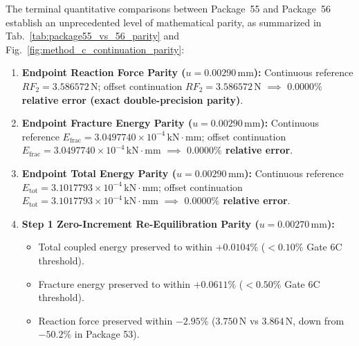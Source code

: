 The terminal quantitative comparisons between Package~55 and Package~56 establish an unprecedented level of mathematical parity, as summarized in Tab.~\ref{tab:package55_vs_56_parity} and Fig.~\ref{fig:method_c_continuation_parity}:
\begin{enumerate}
  \item \textbf{Endpoint Reaction Force Parity ($u = 0.00290\,\mathrm{mm}$):} Continuous reference $RF_2 = 3.586572\,\mathrm{N}$; offset continuation $RF_2 = 3.586572\,\mathrm{N}$ $\implies$ \textbf{$\mathbf{0.0000\%}$ relative error (exact double-precision parity)}.
  \item \textbf{Endpoint Fracture Energy Parity ($u = 0.00290\,\mathrm{mm}$):} Continuous reference $E_{\mathrm{frac}} = 3.0497740 \times 10^{-4}\,\mathrm{kN\cdot mm}$; offset continuation $E_{\mathrm{frac}} = 3.0497740 \times 10^{-4}\,\mathrm{kN\cdot mm}$ $\implies$ \textbf{$\mathbf{0.0000\%}$ relative error}.
  \item \textbf{Endpoint Total Energy Parity ($u = 0.00290\,\mathrm{mm}$):} Continuous reference $E_{\mathrm{tot}} = 3.1017793 \times 10^{-4}\,\mathrm{kN\cdot mm}$; offset continuation $E_{\mathrm{tot}} = 3.1017793 \times 10^{-4}\,\mathrm{kN\cdot mm}$ $\implies$ \textbf{$\mathbf{0.0000\%}$ relative error}.
  \item \textbf{Step 1 Zero-Increment Re-Equilibration Parity ($u = 0.00270\,\mathrm{mm}$):}
    \begin{itemize}
      \item Total coupled energy preserved to within \textbf{$\mathbf{+0.0104\%}$} ($< 0.10\%$ Gate 6C threshold).
      \item Fracture energy preserved to within \textbf{$\mathbf{+0.0611\%}$} ($< 0.50\%$ Gate 6C threshold).
      \item Reaction force preserved within $-2.95\%$ ($3.750\,\mathrm{N}$ vs $3.864\,\mathrm{N}$, down from $-50.2\%$ in Package 53).
    \end{itemize}
\end{enumerate}

